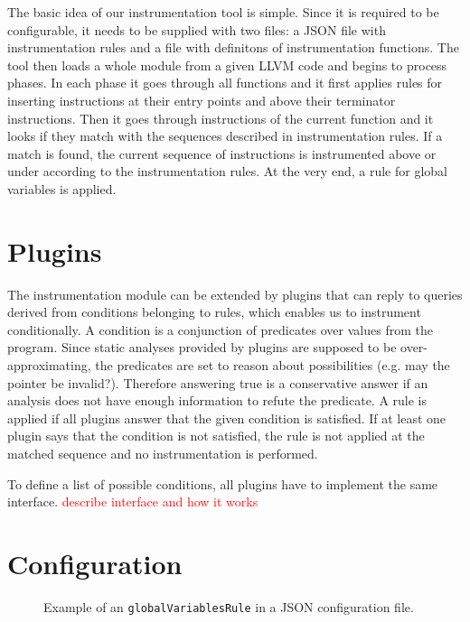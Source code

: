 The basic idea of our instrumentation tool is simple. Since it is required to
be configurable, it needs to be supplied with two files: a JSON file with
instrumentation rules and a file with definitons of instrumentation functions.
The tool then loads a whole module from a given LLVM code and begins to process
phases. In each phase it goes through all functions and it first applies rules for
inserting instructions at their entry points and above their terminator
instructions. Then it goes through instructions of the current function and it
looks if they match with the sequences described in instrumentation rules. If a
match is found, the current sequence of instructions is instrumented above or
under according to the instrumentation rules. At the very end, a rule for
global variables is applied.

\section{Plugins}

The instrumentation module can be extended by plugins that can reply to queries
derived from conditions belonging to rules, which enables us to instrument
conditionally. A condition is a conjunction of predicates over values from the
program. Since static analyses provided by plugins are supposed to be
over-approximating, the predicates are set to reason about possibilities (e.g.
may the pointer be invalid?). Therefore answering true is a conservative answer
if an analysis does not have enough information to refute the predicate. A rule
is applied if all plugins answer that the given condition is satisfied. If at
least one plugin says that the condition is not satisfied, the rule is not
applied at the matched sequence and no instrumentation is performed.

To define a list of possible conditions, all plugins have to implement the same
interface.
\textcolor{red}{describe interface and how it works}

\section{Configuration}


\begin{figure}[h]

\caption{Example of an \texttt{globalVariablesRule} in a JSON configuration file.}
\label{fig:json_example2}
\end{figure}

